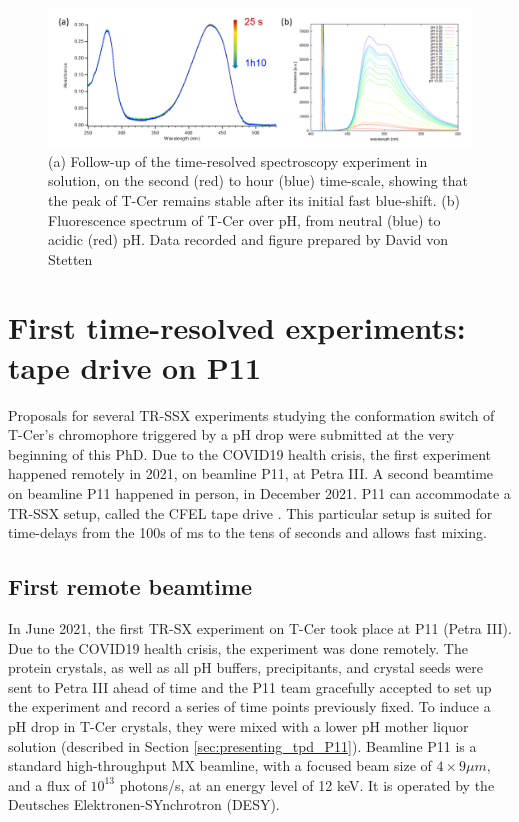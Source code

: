 \begin{figure}
    \centering
    \includegraphics{images/T-Cer/suppfig_fluo_pHjumplong.pdf}
    \caption{(a) Follow-up of the time-resolved spectroscopy experiment in solution, on the second (red) to hour (blue) time-scale, showing that the peak of T-Cer remains stable after its initial fast blue-shift. (b) Fluorescence spectrum of T-Cer over pH, from neutral (blue) to acidic (red) pH. Data recorded and figure prepared by David von Stetten}
    \label{supfig:Fluo_T-Cer}
\end{figure}

\section{First time-resolved experiments: tape drive on P11}\label{sec:P11-1}

Proposals for several TR-SSX experiments studying the conformation switch of T-Cer's chromophore triggered by a pH drop were submitted at the very beginning of this PhD. Due to the COVID19 health crisis, the first experiment happened remotely in 2021, on beamline P11, at Petra III. A second beamtime on beamline P11 happened in person, in December 2021.   
P11 can accommodate a TR-SSX setup, called the CFEL tape drive \parencite{beyerleinMixanddiffuseSerialSynchrotron2017,zielinskiRapidEfficientRoomtemperature2022}. This particular setup is suited for time-delays from the 100s of ms to the tens of seconds and allows fast mixing.

\subsection{First remote beamtime}\label{sec:P11_1}

In June 2021, the first TR-SX experiment on T-Cer took place at P11 (Petra III). Due to the COVID19 health crisis, the experiment was done remotely. The protein crystals, as well as all pH buffers, precipitants, and crystal seeds were sent to Petra III ahead of time and the P11 team gracefully accepted to set up the experiment and record a series of time points previously fixed. To induce a pH drop in T-Cer crystals, they were mixed with a lower pH mother liquor solution (described in Section \ref{sec:presenting_tpd_P11}). Beamline P11 is a standard high-throughput MX beamline, with a focused beam size of \(4 \times 9 \mu m\), and a flux of \(10^{13}\) photons/s, at an energy level of 12 keV. It is operated by the Deutsches Elektronen-SYnchrotron (DESY).

